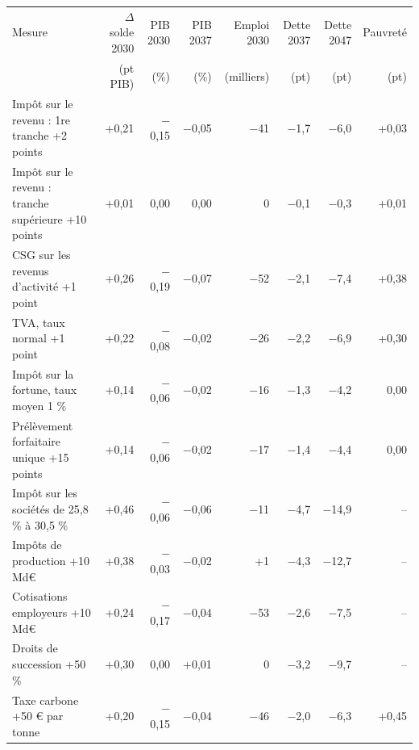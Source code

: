 \begin{tabular}{p{5.2cm}rrrrrrr}
\toprule
Mesure & $\Delta$solde 2030 & PIB 2030 & PIB 2037 & Emploi 2030 & Dette 2037 & Dette 2047 & Pauvreté \\
 & (pt PIB) & (\%) & (\%) & (milliers) & (pt) & (pt) & (pt) \\
\midrule
Impôt sur le revenu : 1re tranche +2 points & +0{,}21 & $-$0{,}15 & $-$0{,}05 & $-$41 & $-$1{,}7 & $-$6{,}0 & +0{,}03 \\
Impôt sur le revenu : tranche supérieure +10 points & +0{,}01 & 0{,}00 & 0{,}00 & 0 & $-$0{,}1 & $-$0{,}3 & +0{,}01 \\
CSG sur les revenus d'activité +1 point & +0{,}26 & $-$0{,}19 & $-$0{,}07 & $-$52 & $-$2{,}1 & $-$7{,}4 & +0{,}38 \\
TVA, taux normal +1 point & +0{,}22 & $-$0{,}08 & $-$0{,}02 & $-$26 & $-$2{,}2 & $-$6{,}9 & +0{,}30 \\
Impôt sur la fortune, taux moyen 1 \% & +0{,}14 & $-$0{,}06 & $-$0{,}02 & $-$16 & $-$1{,}3 & $-$4{,}2 & 0{,}00 \\
Prélèvement forfaitaire unique +15 points & +0{,}14 & $-$0{,}06 & $-$0{,}02 & $-$17 & $-$1{,}4 & $-$4{,}4 & 0{,}00 \\
Impôt sur les sociétés de 25,8 \% à 30,5 \% & +0{,}46 & $-$0{,}06 & $-$0{,}06 & $-$11 & $-$4{,}7 & $-$14{,}9 & -- \\
Impôts de production +10 Md€ & +0{,}38 & $-$0{,}03 & $-$0{,}02 & +1 & $-$4{,}3 & $-$12{,}7 & -- \\
Cotisations employeurs +10 Md€ & +0{,}24 & $-$0{,}17 & $-$0{,}04 & $-$53 & $-$2{,}6 & $-$7{,}5 & -- \\
Droits de succession +50 \% & +0{,}30 & 0{,}00 & +0{,}01 & 0 & $-$3{,}2 & $-$9{,}7 & -- \\
Taxe carbone +50 € par tonne & +0{,}20 & $-$0{,}15 & $-$0{,}04 & $-$46 & $-$2{,}0 & $-$6{,}3 & +0{,}45 \\
\bottomrule
\end{tabular}
